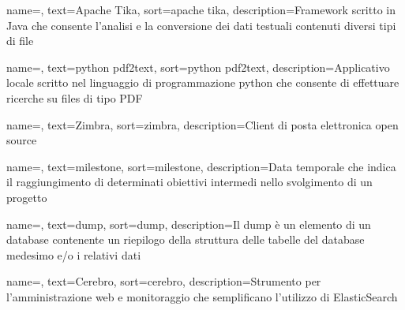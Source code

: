 {
	name=,
	text=Apache Tika,
	sort=apache tika,
	description={\gls{Framework} scritto in \gls{Java} che consente l'analisi e la conversione dei dati testuali contenuti diversi tipi di file}
}

{
	name=,
	text=python pdf2text,
	sort=python pdf2text,
	description={Applicativo locale scritto nel linguaggio di programmazione python che consente di effettuare ricerche su files di tipo PDF}
}

{
	name=,
	text=Zimbra,
	sort=zimbra,
	description={Client di posta elettronica \gls{open source}}
}

{
	name=,
	text=milestone,
	sort=milestone,
	description={Data temporale che indica il raggiungimento di determinati obiettivi intermedi nello svolgimento di un progetto}
}

{
	name=,
	text=dump,
	sort=dump,
	description={Il dump è un elemento di un database contenente un riepilogo della struttura delle tabelle del database medesimo e/o i relativi dati}
}

{
	name=,
	text=Cerebro,
	sort=cerebro,
	description={Strumento per l'amministrazione web e monitoraggio che semplificano l'utilizzo di \gls{ElasticSearch}}
}